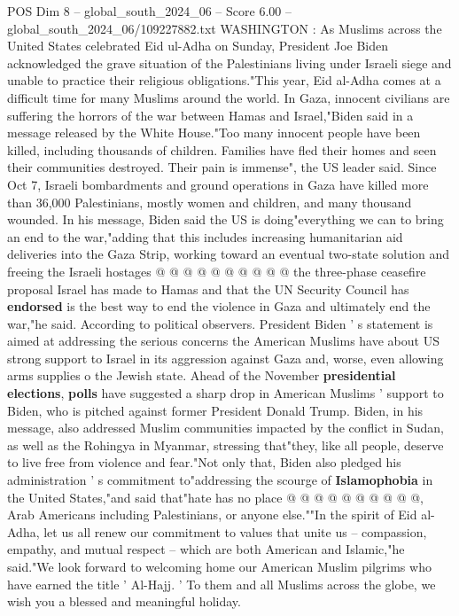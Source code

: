 \begin{textsample}{POS Dim 8 – global\_south\_2024\_06 – Score 6.00 – global\_south\_2024\_06/109227882.txt}  \label{ex:f8_pos_214}
WASHINGTON : As Muslims across the United States celebrated Eid ul-Adha on Sunday, President Joe Biden acknowledged the grave situation of the Palestinians living under Israeli siege and unable to practice their religious obligations."This year, Eid al-Adha comes at a difficult time for many Muslims around the world.
In Gaza, innocent civilians are suffering the horrors of the war between Hamas and Israel,"Biden said in a message released by the White House."Too many innocent people have been killed, including thousands of children.
Families have fled their homes and seen their communities destroyed.
Their pain is immense", the US leader said.
Since Oct 7, Israeli bombardments and ground operations in Gaza have killed more than 36,000 Palestinians, mostly women and children, and many thousand wounded.
In his message, Biden said the US is doing"everything we can to bring an end to the war,"adding that this includes increasing humanitarian aid deliveries into the Gaza Strip, working toward an eventual two-state solution and freeing the Israeli hostages @ @ @ @ @ @ @ @ @ @ the three-phase ceasefire proposal Israel has made to Hamas and that the UN Security Council has \textbf{endorsed} is the best way to end the violence in Gaza and ultimately end the war,"he said.
According to political observers.
President Biden ' s statement is aimed at addressing the serious concerns the American Muslims have about US strong support to Israel in its aggression against Gaza and, worse, even allowing arms supplies o the Jewish state.
Ahead of the November \textbf{presidential} \textbf{elections}, \textbf{polls} have suggested a sharp drop in American Muslims ' support to Biden, who is pitched against former President Donald Trump.
Biden, in his message, also addressed Muslim communities impacted by the conflict in Sudan, as well as the Rohingya in Myanmar, stressing that"they, like all people, deserve to live free from violence and fear."Not only that, Biden also pledged his administration ' s commitment to"addressing the scourge of \textbf{Islamophobia} in the United States,"and said that"hate has no place @ @ @ @ @ @ @ @ @ @, Arab Americans including Palestinians, or anyone else.""In the spirit of Eid al-Adha, let us all renew our commitment to values that unite us -- compassion, empathy, and mutual respect -- which are both American and Islamic,"he said."We look forward to welcoming home our American Muslim pilgrims who have earned the title ' Al-Hajj. ' To them and all Muslims across the globe, we wish you a blessed and meaningful holiday.

\end{textsample}
